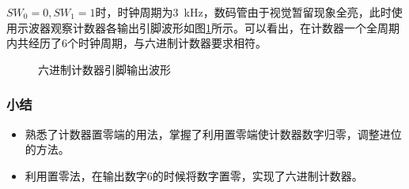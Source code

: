 \documentclass[UTF8]{ctexart}
\numberwithin{figure}{subsection}
\numberwithin{table}{subsection}
\numberwithin{equation}{subsection}
\begin{document}
\par \(SW_0 =0 ,  SW_1 = 1\)时，时钟周期为\SI{3}{\kHz}，数码管由于视觉暂留现象全亮，此时使用示波器观察计数器各输出引脚波形如图\ref{6set0}所示。可以看出，在计数器一个全周期内共经历了6个时钟周期，与六进制计数器要求相符。

\begin{figure}[H]
    \centering

    \caption{六进制计数器引脚输出波形}
    \label{6set0}
\end{figure}

\subsubsection{小结}
\begin{itemize}
    \item 熟悉了计数器置零端的用法，掌握了利用置零端使计数器数字归零，调整进位的方法。
    \item 利用置零法，在输出数字6的时候将数字置零，实现了六进制计数器。
\end{itemize}
\end{document}
